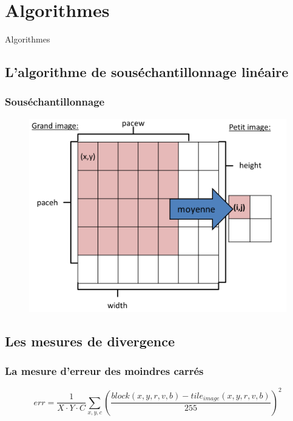 \documentclass[handout]{beamer}
\begin{document}
\section{Algorithmes}

\begin{frame}
\begin{center}
{\Huge Algorithmes}
\end{center}
\end{frame}

\subsection{L'algorithme de sous\'echantillonnage lin\'eaire}
\begin{frame}
\frametitle{\bf Sous\'echantillonnage}
\begin{figure}[H]
\includegraphics[scale=0.36]{scale_to.png}
\end{figure}
\end{frame}


\subsection{Les mesures de divergence}

\begin{frame}
\frametitle{\bf La mesure d'erreur des moindres carr\'es}
\begin{equation*}
err=\frac{1}{X\cdot Y\cdot C}\sum_{x,y,c}\left(\frac{block(x,y,r,v,b)-tile_{image}(x,y,r,v,b)}{255}\right)^2
\end{equation*}
\end{frame}
\end{document}
